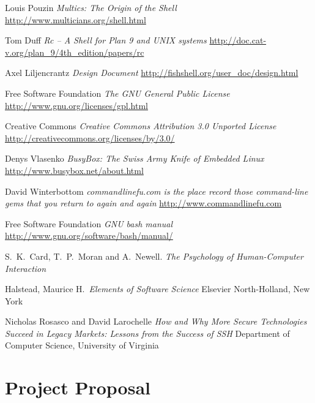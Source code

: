\documentclass[12pt,twoside,notitlepage]{report}
\begin{document}
\begin{thebibliography}{11} %

  Louis Pouzin
  \emph{Multics: The Origin of the Shell}
  \url{http://www.multicians.org/shell.html}

  Tom Duff
  \emph{Rc -- A Shell for Plan 9 and UNIX systems}
  \url{http://doc.cat-v.org/plan\_9/4th\_edition/papers/rc}

  Axel Liljencrantz
  \emph{Design Document}
  \url{http://fishshell.org/user\_doc/design.html}

  Free Software Foundation
  \emph{The GNU General Public License}
  \url{http://www.gnu.org/licenses/gpl.html}

  Creative Commons
  \emph{Creative Commons Attribution 3.0 Unported License}
  \url{http://creativecommons.org/licenses/by/3.0/}

  Denys Vlasenko
  \emph{BusyBox: The Swiss Army Knife of Embedded Linux}
  \url{http://www.busybox.net/about.html}

  David Winterbottom
  \emph{commandlinefu.com is the place record those command-line gems that
  you return to again and again}
  \url{http://www.commandlinefu.com}

  Free Software Foundation
  \emph{GNU bash manual}
  \url{http://www.gnu.org/software/bash/manual/}

  S.\ K.\ Card, T.\ P.\ Moran and A.\ Newell. 
  \emph{The Psychology of Human-Computer Interaction}

  Halstead, Maurice H.\ 
  \emph{Elements of Software Science}
  Elsevier North-Holland, New York

  Nicholas Rosasco and David Larochelle
  \emph{How and Why More Secure Technologies Succeed in Legacy
  Markets: Lessons from the Success of SSH}
  Department of Computer Science, University of Virginia   

\end{thebibliography}
\cleardoublepage

\appendix

\chapter{Project Proposal}
\end{document}
